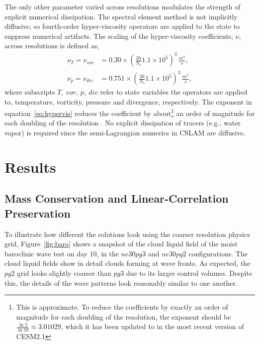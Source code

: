 \documentclass{agujournal}
\begin{document}
The only other parameter varied across resolutions modulates the strength of explicit numerical dissipation. The spectral element method is not implicitly diffusive, so fourth-order hyper-viscosity operators are applied to the state to suppress numerical artifacts. The scaling of the hyper-viscosity coefficients, $\nu$, across resolutions is defined as,
\begin{align}
\nu_T = \nu_{vor} &= 0.30\times \left(\frac{30}{N_e}1.1\times 10^5\right)^3\, \frac{m^4}{s}, \\
\nu_p = \nu_{div} &= 0.751\times \left(\frac{30}{N_e}1.1\times 10^5\right)^3\, \frac{m^4}{s},
\label{eq:hypervis}
\end{align}
where subscripts $T,~vor,~p,~div$ refer to state variables the operators are applied to, temperature, vorticity, pressure and divergence, respectively. The exponent in equation~\eqref{eq:hypervis} reduces the coefficient by about\footnote{This is approximate. To reduce the coefficients by exactly an order of magnitude for each doubling of the resolution, the exponent should be $\frac{\ln{2}}{\ln{10}}\approx3.01029$, which it has been updated to in the most recent version of CESM2.1} an order of magnitude for each doubling of the resolution \citep[as in][]{LetAl2018JAMES}. No explicit dissipation of tracers (e.g., water vapor) is required since the semi-Lagrangian numerics in CSLAM are diffusive.

\section{Results}\label{sec:results}

\subsection{Mass Conservation and Linear-Correlation Preservation}\label{sec:fkessler}

To illustrate how different the solutions look using the coarser resolution physics grid, Figure~\ref{fig:baro} shows a snapshot of the cloud liquid field of the moist baroclinic wave test on day 10, in the $ne30pg3$ and $ne30pg2$ configurations. The cloud liquid fields show in detail clouds forming at wave fronts. As expected, the $pg2$ grid looks slightly coarser than $pg3$ due to its larger control volumes. Despite this, the details of the wave patterns look reasonably similar to one another.
\end{document}
